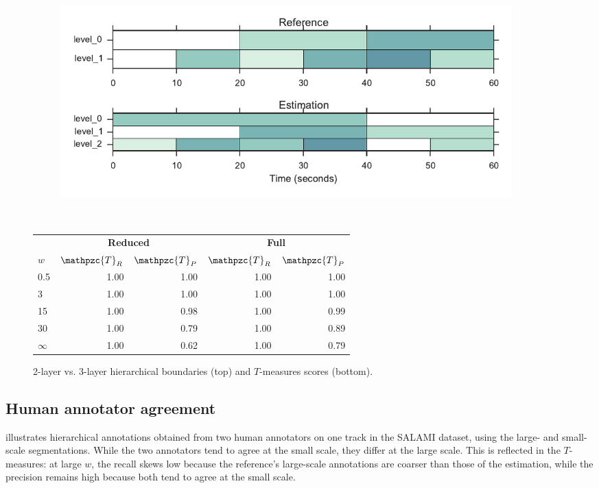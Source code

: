 \documentclass{article}
\def\shag{\ensuremath{\mathpzc{T}}}
\begin{document}
\begin{figure}[t]
  \centering
  \begin{subfigure}{0.5\textwidth}
    \centering
    \includegraphics[width=0.94\textwidth]{figs/hier-hiercomp.pdf}
  \end{subfigure}%
  \\
  \begin{minipage}{0.5\textwidth}
    \small
    \centering
    \vspace{10pt}
    \begin{tabular}{l|rr|rr}
      & \multicolumn{2}{c|}{\textbf{Reduced}} & \multicolumn{2}{c}{\textbf{Full}} \\
      $w$       & $\shag_R$    & $\shag_P$  & $\shag_R$ & $\shag_P$    \\
      \hline
      0.5       & 1.00       & 1.00      & 1.00 & 1.00\\     
      3         & 1.00       & 1.00      & 1.00 & 1.00\\
      15        & 1.00       & 0.98      & 1.00 & 0.99\\
      30        & 1.00       & 0.79      & 1.00 & 0.89\\
      $\infty$  & 1.00       & 0.62     & 1.00 & 0.79  
    \end{tabular}
  \end{minipage}
  \caption{2-layer vs. 3-layer hierarchical boundaries (top) and $T$-measures scores (bottom).}
  \label{fig:hier-hiercomp}
\end{figure}


\subsection{Human annotator agreement}
 illustrates hierarchical annotations obtained from two human annotators on one track in
the SALAMI dataset, using the large- and small-scale segmentations.
While the two annotators tend to agree at the small scale, they differ at the large scale.
This is reflected in the $T$-measures: at large $w$, the recall skews low because the 
reference's large-scale annotations are coarser than those of the estimation, while the precision remains high because both tend to agree at the small scale.
\end{document}
